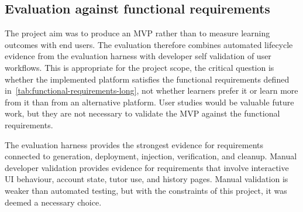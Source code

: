 \subsection{Evaluation against functional requirements}\label{sec:eval-against-func-req}

The project aim was to produce an MVP rather than to measure learning outcomes with end users. The evaluation therefore combines automated lifecycle evidence from the evaluation harness with developer self validation of user workflows. This is appropriate for the project scope, the critical question is whether the implemented platform satisfies the functional requirements defined in~\ref{tab:functional-requirements-long}, not whether learners prefer it or learn more from it than from an alternative platform. User studies would be valuable future work, but they are not necessary to validate the MVP against the functional requirements.

The evaluation harness provides the strongest evidence for requirements connected to generation, deployment, injection, verification, and cleanup. Manual developer validation provides evidence for requirements that involve interactive UI behaviour, account state, tutor use, and history pages. Manual validation is weaker than automated testing, but with the constraints of this project, it was deemed a necessary choice.

